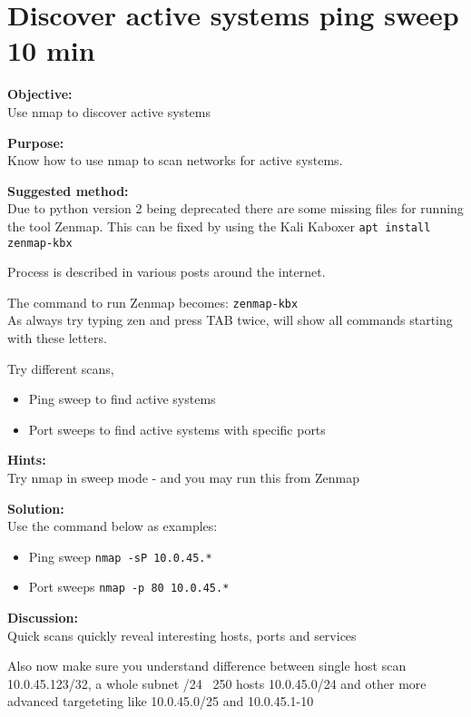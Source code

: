 \documentclass[a4paper,11pt,notitlepage]{report}
\begin{document}
\chapter{Discover active systems ping sweep 10 min}
\label{ex:nmap-pingsweep}

{\bf Objective:}\\
Use nmap to discover active systems

{\bf Purpose:}\\
Know how to use nmap to scan networks for active systems.

{\bf Suggested method:}\\

Due to python version 2 being deprecated there are some missing files for running the tool Zenmap. This can be fixed by using the Kali Kaboxer \verb+apt install zenmap-kbx+

Process is described in various posts around the internet. 

The command to run Zenmap becomes: \verb+zenmap-kbx+\\
As always try typing zen and press TAB twice, will show all commands starting with these letters.

Try different scans,
\begin{itemize}
\item Ping sweep to find active systems
\item Port sweeps to find active systems with specific ports
\end{itemize}

{\bf Hints:} \\
Try nmap in sweep mode - and you may run this from Zenmap

{\bf Solution:}\\
Use the command below as examples:
\begin{itemize}
\item Ping sweep \verb+nmap -sP 10.0.45.*+
\item Port sweeps \verb+nmap -p 80 10.0.45.*+
\end{itemize}

{\bf Discussion:}\\
Quick scans quickly reveal interesting hosts, ports and services

Also now make sure you understand difference between single host scan
10.0.45.123/32, a whole subnet /24 ~250 hosts 10.0.45.0/24 and other more advanced targeteting like 10.0.45.0/25 and 10.0.45.1-10
\end{document}
